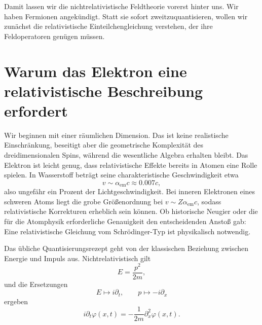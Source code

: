 \begin{classroomqa}\end{classroomqa}

Damit lassen wir die nichtrelativistische Feldtheorie vorerst hinter uns. Wir haben Fermionen angekündigt. Statt sie sofort zweitzuquantisieren, wollen wir zunächst die relativistische Einteilchengleichung verstehen, der ihre Feldoperatoren genügen müssen.

\section{Warum das Elektron eine relativistische Beschreibung erfordert}

Wir beginnen mit einer räumlichen Dimension. Das ist keine realistische Einschränkung, beseitigt aber die geometrische Komplexität des dreidimensionalen Spins, während die wesentliche Algebra erhalten bleibt. Das Elektron ist leicht genug, dass relativistische Effekte bereits in Atomen eine Rolle spielen. In Wasserstoff beträgt seine charakteristische Geschwindigkeit etwa
\begin{equation}
v\sim\alpha_{\mathrm{em}}c\approx 0.007c,
\end{equation}
also ungefähr ein Prozent der Lichtgeschwindigkeit. Bei inneren Elektronen eines schweren Atoms liegt die grobe Größenordnung bei \(v\sim Z\alpha_{\mathrm{em}}c\), sodass relativistische Korrekturen erheblich sein können. Ob historische Neugier oder die für die Atomphysik erforderliche Genauigkeit den entscheidenden Anstoß gab: Eine relativistische Gleichung vom Schr\"odinger-Typ ist physikalisch notwendig.

Das übliche Quantisierungsrezept geht von der klassischen Beziehung zwischen Energie und Impuls aus. Nichtrelativistisch gilt
\begin{equation}
E=\frac{p^2}{2m},
\end{equation}
und die Ersetzungen
\begin{equation}
E\mapsto i\partial_t,
\qquad
p\mapsto-i\partial_x
\end{equation}
ergeben
\begin{equation}
i\partial_t\varphi(x,t)
=-\frac{1}{2m}\partial_x^2\varphi(x,t).
\end{equation}

